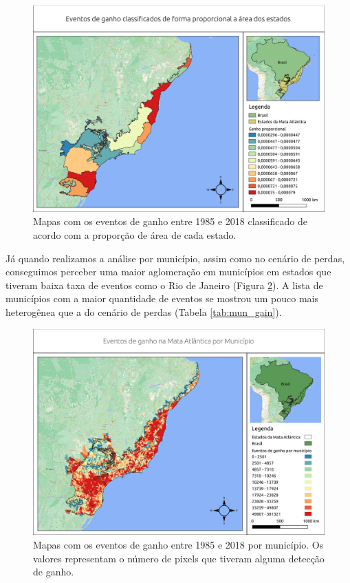 \begin{figure}[H]
    \centering
    \includegraphics[scale=.5]{images/estado_gain_proporcional.pdf}
    \caption{Mapas com os eventos de ganho entre 1985 e 2018 classificado de acordo com a proporção de área de cada estado.}
    \label{fig:estados_gain_proporcional}
\end{figure}

Já quando realizamos a análise por município, assim como no cenário de perdas, conseguimos perceber uma maior aglomeração em municípios em estados que tiveram baixa taxa de eventos como o Rio de Janeiro (Figura \ref{fig:mun_gain}). A lista de municípios com a maior quantidade de eventos se mostrou um pouco mais heterogênea que a do cenário de perdas (Tabela \ref{tab:mun_gain}). 

\begin{figure}[H]
    \centering
    \includegraphics[scale=.5]{images/mun_gain_seg6_masked18_dur_gt4_inv_for.pdf}
    \caption{Mapas com os eventos de ganho entre 1985 e 2018 por município. Os valores representam o número de pixels que tiveram alguma detecção de ganho.}
    \label{fig:mun_gain}
\end{figure}

